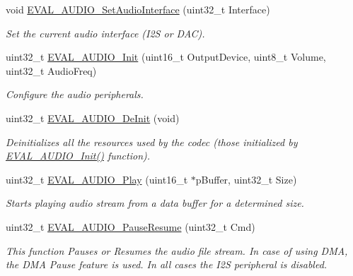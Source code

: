 \begin{DoxyCompactItemize}
\item 
void \hyperlink{group___s_t_m32_f4___d_i_s_c_o_v_e_r_y___a_u_d_i_o___c_o_d_e_c___private___functions_gaeba4b4a5e51d99929d303b6cdf006641}{E\-V\-A\-L\-\_\-\-A\-U\-D\-I\-O\-\_\-\-Set\-Audio\-Interface} (uint32\-\_\-t Interface)
\begin{DoxyCompactList}\small\item\em Set the current audio interface (I2\-S or D\-A\-C). \end{DoxyCompactList}\item 
uint32\-\_\-t \hyperlink{group___s_t_m32_f4___d_i_s_c_o_v_e_r_y___a_u_d_i_o___c_o_d_e_c___private___functions_gaeb1a379374e6e0ae4276ef087e213524}{E\-V\-A\-L\-\_\-\-A\-U\-D\-I\-O\-\_\-\-Init} (uint16\-\_\-t Output\-Device, uint8\-\_\-t Volume, uint32\-\_\-t Audio\-Freq)
\begin{DoxyCompactList}\small\item\em Configure the audio peripherals. \end{DoxyCompactList}\item 
uint32\-\_\-t \hyperlink{group___s_t_m32_f4___d_i_s_c_o_v_e_r_y___a_u_d_i_o___c_o_d_e_c___private___functions_gaa7b87a9dee532c3f2b7b9be18f8c20e8}{E\-V\-A\-L\-\_\-\-A\-U\-D\-I\-O\-\_\-\-De\-Init} (void)
\begin{DoxyCompactList}\small\item\em Deinitializes all the resources used by the codec (those initialized by \hyperlink{group___s_t_m32_f4___d_i_s_c_o_v_e_r_y___a_u_d_i_o___c_o_d_e_c___private___functions_gaeb1a379374e6e0ae4276ef087e213524}{E\-V\-A\-L\-\_\-\-A\-U\-D\-I\-O\-\_\-\-Init()} function). \end{DoxyCompactList}\item 
uint32\-\_\-t \hyperlink{group___s_t_m32_f4___d_i_s_c_o_v_e_r_y___a_u_d_i_o___c_o_d_e_c___private___functions_ga0422f1985733a86bdc2d8d42eeaafac5}{E\-V\-A\-L\-\_\-\-A\-U\-D\-I\-O\-\_\-\-Play} (uint16\-\_\-t $\ast$p\-Buffer, uint32\-\_\-t Size)
\begin{DoxyCompactList}\small\item\em Starts playing audio stream from a data buffer for a determined size. \end{DoxyCompactList}\item 
uint32\-\_\-t \hyperlink{group___s_t_m32_f4___d_i_s_c_o_v_e_r_y___a_u_d_i_o___c_o_d_e_c___private___functions_ga6c6084dfd89cd5ea01440fef86031e18}{E\-V\-A\-L\-\_\-\-A\-U\-D\-I\-O\-\_\-\-Pause\-Resume} (uint32\-\_\-t Cmd)
\begin{DoxyCompactList}\small\item\em This function Pauses or Resumes the audio file stream. In case of using D\-M\-A, the D\-M\-A Pause feature is used. In all cases the I2\-S peripheral is disabled. \end{DoxyCompactList}\item 

\end{DoxyCompactItemize}
